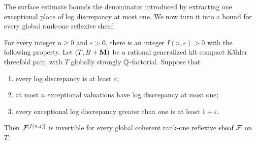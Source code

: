 The surface estimate bounds the denominator introduced by extracting one
exceptional place of log discrepancy at most one.  We now turn it into a
bound for every global rank-one reflexive sheaf.

\begin{lemma}\label{lem:index-bound}
For every integer $n\geq0$ and $\varepsilon>0$, there is an integer
$I(n,\varepsilon)>0$ with the following property.  Let
$(T,B+\mathbf M)$ be a rational generalized klt compact K\"ahler threefold pair,
with $T$ globally strongly $\mathbb Q$-factorial.  Suppose that
\begin{enumerate}[label=\textup{(\roman*)}]
 \item every log discrepancy is at least $\varepsilon$;
 \item at most $n$ exceptional valuations have log discrepancy at most one;
 \item every exceptional log discrepancy greater than one is at least
       $1+\varepsilon$.
\end{enumerate}
Then $\mathcal F^{[I(n,\varepsilon)]}$ is invertible for every global coherent
rank-one reflexive sheaf $\mathcal F$ on $T$.
\end{lemma}

